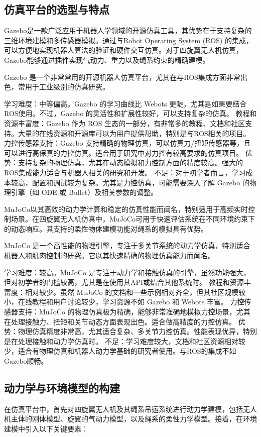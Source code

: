 \documentclass[lang=chs, degree=master, blindreview=false, winfonts=true]{yanputhesis}
\begin{document}
\subsection{仿真平台的选型与特点}
Gazebo是一款广泛应用于机器人学领域的开源仿真工具，其优势在于支持复杂的三维环境建模和多传感器模拟。通过与Robot Operating System (ROS) 的集成，可以方便地实现机器人算法的验证和硬件交互仿真。对于四旋翼无人机仿真，Gazebo能够通过插件实现气动力、重力以及绳系约束的精确建模。

Gazebo 是一个非常常用的开源机器人仿真平台，尤其在与ROS集成方面非常出色，常用于工业级别的仿真研究。

学习难度：中等偏高。Gazebo 的学习曲线比 Webots 更陡，尤其是如果要结合ROS使用。不过，Gazebo 的灵活性和扩展性较好，可以支持复杂的仿真。
教程和资源丰富度：Gazebo 作为 ROS 生态的一部分，有非常多的教程、文档和社区支持。大量的在线资源和开源库可以为用户提供帮助，特别是与ROS相关的项目。
力控传感器支持：Gazebo 支持精确的物理仿真，可以仿真力/扭矩传感器等，且可以进行高保真的力控仿真。适合用于研究中对力控有较高要求的仿真项目。
优势：支持复杂的物理仿真，尤其在动态模拟和力控制方面的精度较高。强大的ROS集成能力适合与机器人相关的研究和开发。
不足：对于初学者而言，学习成本较高，配置和调试较为复杂。尤其是力控仿真，可能需要深入了解 Gazebo 的物理引擎（如 ODE 或 Bullet）及相关参数的调整。
	

MuJoCo以其高效的动力学计算和稳定的仿真性能而闻名，特别适用于高频实时控制场景。在四旋翼无人机仿真中，MuJoCo可用于快速评估系统在不同环境约束下的动态响应。其支持的柔性物体建模功能对绳系的模拟具有优势。

MuJoCo 是一个高性能的物理引擎，专注于多关节系统的动力学仿真，特别适合机器人和肌肉控制的研究。它以其快速精确的物理仿真能力而闻名。

学习难度：较高。MuJoCo 是专注于动力学和接触仿真的引擎，虽然功能强大，但对初学者的门槛较高，尤其是在使用其API或结合其他系统时。
教程和资源丰富度：相对较少。虽然 MuJoCo 的文档和一些示例相对齐全，但其社区规模较小，在线教程和用户讨论较少，学习资源不如 Gazebo 和 Webots 丰富。
力控传感器支持：MuJoCo 的物理仿真极为精确，能够非常准确地模拟力控场景，尤其在处理接触力、扭矩和关节动态方面表现出色。适合做高精度的力控仿真。
优势：物理仿真精度非常高，尤其适合复杂、多关节力控仿真。性能表现优异，特别是在处理接触和动力学仿真时。
不足：学习难度较大，文档和社区资源相对较少，适合有物理仿真和机器人动力学基础的研究者使用。与ROS的集成不如Gazebo顺畅。


\subsection{动力学与环境模型的构建}
在仿真平台中，首先对四旋翼无人机及其绳系吊运系统进行动力学建模，包括无人机主体的刚体模型、旋翼的气动力模型，以及绳系的柔性力学模型。接着，在环境建模中引入以下关键要素：
\end{document}
